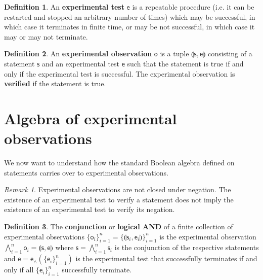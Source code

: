 \documentclass[review]{elsarticle}
\theoremstyle{plain}%
\theoremstyle{definition}
\newtheorem{defn}{Definition}[section]
\theoremstyle{remark}
\newtheorem*{rem}{Remark}
\begin{document}
\begin{defn}
	An \textbf{experimental test} $\mathsf{e}$ is a repeatable procedure (i.e. it can be restarted and stopped an arbitrary number of times) which may be successful, in which case it terminates in finite time, or may be not successful, in which case it may or may not terminate.
\end{defn}


\begin{defn}
	An \textbf{experimental observation} $\mathsf{o}$ is a tuple $\llparenthesis \mathsf{s}, \mathsf{e} \rrparenthesis$ consisting of a statement $\mathsf{s}$ and an experimental test $\mathsf{e}$ such that the statement is true if and only if the  experimental test is successful. The experimental observation is \textbf{verified} if the statement is true.
\end{defn}

\section{Algebra of experimental observations}

We now want to understand how the standard Boolean algebra defined on statements carries over to experimental observations.

\begin{rem}
	Experimental observations are not closed under negation. The existence of an experimental test to verify a statement does not imply the existence of an experimental test to verify its negation.
\end{rem}

\begin{defn}
	The \textbf{conjunction} or \textbf{logical AND} of a finite collection  of experimental observations $\{\mathsf{o}_i\}_{i=1}^{n}=\{\llparenthesis \mathsf{s}_i, \mathsf{e}_i\rrparenthesis\}_{i=1}^{n}$ is the experimental observation $\bigwedge\limits_{i=1}^{n} \mathsf{o}_i = \llparenthesis \mathsf{s}, \mathsf{e}\rrparenthesis$ where $\mathsf{s} = \bigwedge\limits_{i=1}^{n} \mathsf{s}_i$ is the conjunction of the respective statements and $\mathsf{e} = \mathsf{e}_\wedge(\{\mathsf{e}_i\}_{i=1}^{n})$ is the experimental test that successfully terminates if and only if all $\{\mathsf{e}_i\}_{i=1}^{n}$ successfully terminate.
\end{defn}
\end{document}
